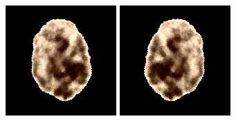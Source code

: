 \begin{figure}[t!]
	\endminipage\hfill
	\centering	
	\includegraphics[width=0.97\linewidth]{Figures/Chapter4/aug_2.png}
	\endminipage\hfill
	\centering	
	\includegraphics[width=0.97\linewidth]{Figures/Chapter4/aug_3.png}

\end{figure}
